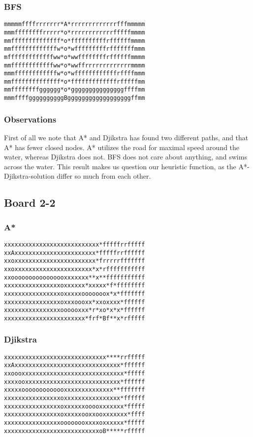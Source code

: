 \documentclass[11pt,a4paper]{article}
\begin{document}
\subsubsection*{BFS}
\begin{lstlisting}
mmmmmffffrrrrrrr*A*rrrrrrrrrrrrrfffmmmmm
mmmffffffffrrrrr*o*rrrrrrrrrrrrfffffmmmm
mmffffffffffffff*o*ffffffffffrffffffmmmm
mmfffffffffffffw*o*wfffffffffrfffffffmmm
mfffffffffffffww*o*wwffffffffrffffffmmmm
mmffffffffffffww*o*wwffrrrrrrrrrrrrrmmmm
mmmffffffffffffw*o*wffffffffffffrffffmmm
mmffffffffffffff*o*fffffffffffffrfffffmm
mmffffffffgggggg*o*gggggggggggggggffffmm
mmmffffggggggggggBggggggggggggggggggffmm
\end{lstlisting}

\subsubsection*{Observations}
First of all we note that A* and Djikstra has found two different paths, and that A* has fewer closed nodes. A* utilizes the road for maximal speed around the water, whereas Djikstra does not. BFS does not care about anything, and swims across the water. 
This result makes us question our heuristic function, as the A*- Djikstra-solution differ so much from each other.


\subsection*{Board 2-2}
\subsubsection*{A*}
\begin{lstlisting}
xxxxxxxxxxxxxxxxxxxxxxxxxxx*fffffrrfffff
xxAxxxxxxxxxxxxxxxxxxxxxxx*fffffrrffffff
xxoxxxxxxxxxxxxxxxxxxxxxxx*frrrrrfffffff
xxoxxxxxxxxxxxxxxxxxxxxxx*x*rfffffffffff
xxoooooooooooooooxxxxxxx**x**fffffffffff
xxxxxxxxxxxxxxxxoxxxxxx*xxxxx*f*ffffffff
xxxxxxxxxxxxxxxxoxxxxxooooooox*x*fffffff
xxxxxxxxxxxxxxxxoxxxoooxx*xxoxxxx*ffffff
xxxxxxxxxxxxxxxxoooooxxx*r*xo*x*x*ffffff
xxxxxxxxxxxxxxxxxxxxxxx*frf*Bf**x*rfffff
\end{lstlisting}

\subsubsection*{Djikstra}
\begin{lstlisting}
xxxxxxxxxxxxxxxxxxxxxxxxxxxxx****rrfffff
xxAxxxxxxxxxxxxxxxxxxxxxxxxxxxxxx*ffffff
xxoooxxxxxxxxxxxxxxxxxxxxxxxxxxxxx*fffff
xxxxooxxxxxxxxxxxxxxxxxxxxxxxxxxx*ffffff
xxxxxooooooooooooxxxxxxxxxxxxxx**fffffff
xxxxxxxxxxxxxxxxoxxxxxxxxxxxxxxxx*ffffff
xxxxxxxxxxxxxxxxoxxxxxxooooxxxxxxx*fffff
xxxxxxxxxxxxxxxxoxxxxxooxxooxxxxxxx*ffff
xxxxxxxxxxxxxxxxoooooooxxxxoxxxxxx*fffff
xxxxxxxxxxxxxxxxxxxxxxxxxxxoB*****rfffff
\end{lstlisting}
\end{document}
